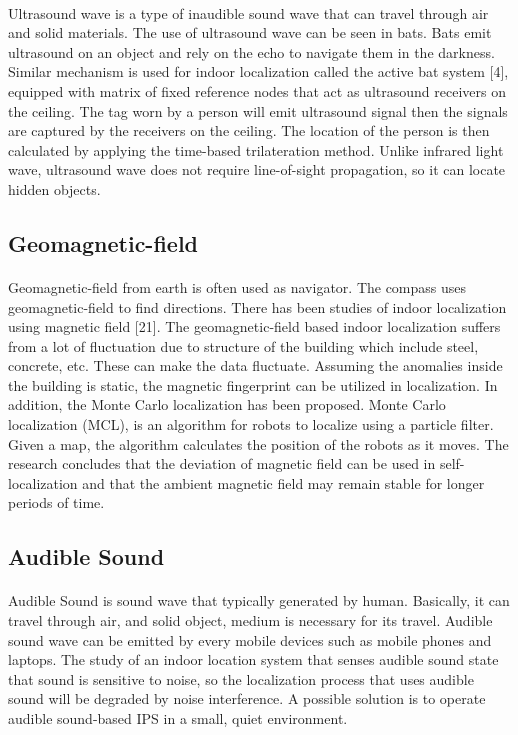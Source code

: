 \paragraph{} Ultrasound wave is a type of inaudible sound wave that can travel through air and solid materials. The use of ultrasound wave can be seen in bats. Bats emit ultrasound on an object and rely on the echo to navigate them in the darkness. Similar mechanism is used for indoor localization called the active bat system [4],  equipped with matrix of fixed reference nodes that act as ultrasound receivers on the ceiling. The tag worn by a person will emit ultrasound signal then the signals are captured by the receivers on the ceiling. The location of the person is then calculated by applying the time-based trilateration method. Unlike infrared light wave, ultrasound wave does not require line-of-sight propagation, so it can locate hidden objects.

\subsection{Geomagnetic-field}
\paragraph{} Geomagnetic-field from earth is often used as navigator. The compass uses geomagnetic-field to find directions. There has been studies of indoor localization using magnetic field [21]. The geomagnetic-field based indoor localization suffers from a lot of fluctuation due to structure of the building which include steel, concrete, etc. These can make the data fluctuate. Assuming the anomalies inside the building is static, the magnetic fingerprint can be utilized in localization. In addition, the Monte Carlo localization has been proposed. Monte Carlo localization (MCL), is an algorithm for robots to localize using a particle filter. Given a map, the algorithm calculates the position of the robots as it moves. The research concludes that the deviation of magnetic field can be used in self-localization and that the ambient magnetic field may remain stable for longer periods of time.

\subsection{Audible Sound}
\paragraph{} Audible Sound is sound wave that typically generated by human. Basically, it can travel through air, and solid object, medium is necessary for its travel. Audible sound wave can be emitted by every mobile devices such as mobile phones and laptops. The study of an indoor location system that senses audible sound state that sound is sensitive to noise, so the localization process that uses audible sound will be degraded by noise interference. A possible solution is to operate audible sound-based IPS in a small, quiet environment.

